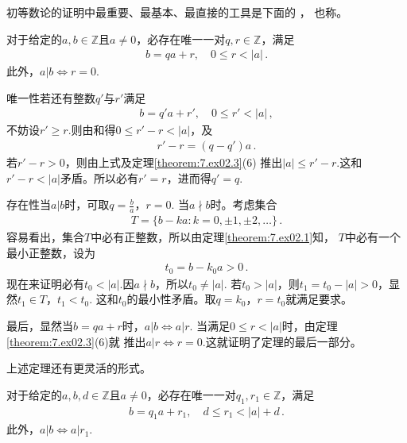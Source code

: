 初等数论的证明中最重要、最基本、最直接的工具是下面的
，
也称。
\begin{theorem}\label{theorem:7.ex02.4}
    对于给定的$a,b\in\mathbb{Z}$且$a\neq0$，必存在唯一一对$q,r\in\mathbb{Z}$，满足
    \begin{align}\label{eq:7.ex02.EuclideanDivision}
        b=qa+r,\quad 0\le r<|a|\, .
    \end{align}
    此外，$a|b \Leftrightarrow r=0$.
\end{theorem}
\begin{prove}
    {\sffamily 唯一性}\quad 若还有整数$q'$与$r'$满足
    \begin{align}\label{eq:7.ex02.prove-theorem4-01}
        b=q'a+r',\quad 0\le r'<|a|\, ,
    \end{align}
    不妨设$r'\ge r$.则由和得$0\le r'-r<|a|$，及
    \begin{align}
        r'-r=(q-q')a\, .
    \end{align}
    若$r'-r>0$，则由上式及定理\ref{theorem:7.ex02.3}(6)
    推出$|a|\le r'-r$.这和$r'-r<|a|$矛盾。所以必有$r'=r$，进而得$q'=q$.

        {\sffamily 存在性}\quad 当$a|b$时，可取$q=\displaystyle\frac{b}{a}$，$r=0$.
    当$a\nmid b$时。考虑集合
    \begin{align}
        T=\{b-ka:k=0,\pm1,\pm2,\ldots\}\, .
    \end{align}
    容易看出，集合$T$中必有正整数，所以由定理\ref{theorem:7.ex02.1}知，
    $T$中必有一个最小正整数，设为
    \begin{align}
        t_0=b-k_0a>0\, .
    \end{align}
    现在来证明必有$t_0<|a|$.因$a\nmid b$，所以$t_0\neq |a|$.
    若$t_0>|a|$，则$t_1=t_0-|a|>0$，显然$t_1\in T$，$t_1<t_0$.
    这和$t_0$的最小性矛盾。取$q=k_0$，$r=t_0$就满足要求。

    最后，显然当$b=qa+r$时，$a|b \Leftrightarrow a|r$.
    当满足$0\le r<|a|$时，由定理\ref{theorem:7.ex02.3}(6)就
    推出$a|r \Leftrightarrow r=0$.这就证明了定理的最后一部分。
\end{prove}

上述定理还有更灵活的形式。
\begin{theorem}\label{theorem:7.ex02.5}
    对于给定的$a,b,d\in\mathbb{Z}$且$a\neq0$，必存在唯一一对$q_1,r_1\in\mathbb{Z}$，满足
    \begin{align}\label{eq:7.7.ex02.remainder}
        b=q_1a+r_1,\quad d\le r_1<|a|+d\, .
    \end{align}
    此外，$a|b \Leftrightarrow a|r_1$.
\end{theorem}

